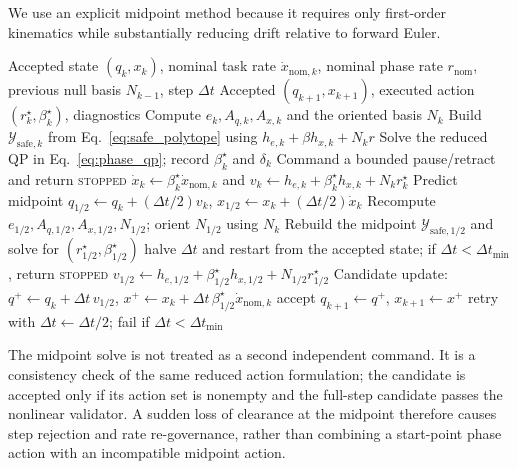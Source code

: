 \documentclass[preprint,12pt]{elsarticle}
\begin{document}
We use an explicit midpoint method because it requires only first-order kinematics while substantially reducing drift relative to forward Euler.

\begin{algorithm}[t]
\caption{One adaptive branch-preserving differential-lift step}
\label{alg:lift_step}
\begin{algorithmic}[1]
\Require Accepted state $(q_k,x_k)$, nominal task rate $\dot x_{\mathrm{nom},k}$, nominal phase rate $r_{\mathrm{nom}}$, previous null basis $N_{k-1}$, step $\Delta t$
\Ensure Accepted $(q_{k+1},x_{k+1})$, executed action $(r_k^\star,\beta_k^\star)$, diagnostics
\State Compute $e_k,A_{q,k},A_{x,k}$ and the oriented basis $N_k$
\State Build $\mathcal Y_{\mathrm{safe},k}$ from Eq.~\eqref{eq:safe_polytope} using $h_{e,k}+\beta h_{x,k}+N_kr$
\State Solve the reduced QP in Eq.~\eqref{eq:phase_qp}; record $\beta_k^\star$ and $\delta_k$
    \State Command a bounded pause/retract and return \textsc{stopped}
\EndIf
\State $\dot x_k\gets\beta_k^\star\dot x_{\mathrm{nom},k}$ and $v_k\gets h_{e,k}+\beta_k^\star h_{x,k}+N_kr_k^\star$
\State Predict midpoint $q_{1/2}\gets q_k+(\Delta t/2)v_k$, $x_{1/2}\gets x_k+(\Delta t/2)\dot x_k$
\State Recompute $e_{1/2},A_{q,1/2},A_{x,1/2},N_{1/2}$; orient $N_{1/2}$ using $N_k$
\State Rebuild the midpoint $\mathcal Y_{\mathrm{safe},1/2}$ and solve for $(r_{1/2}^\star,\beta_{1/2}^\star)$
    \State halve $\Delta t$ and restart from the accepted state; if $\Delta t<\Delta t_{\min}$, return \textsc{stopped}
\EndIf
\State $v_{1/2}\gets h_{e,1/2}+\beta_{1/2}^\star h_{x,1/2}+N_{1/2}r_{1/2}^\star$
\State Candidate update: $q^+\gets q_k+\Delta t\,v_{1/2}$, $x^+\gets x_k+\Delta t\,\beta_{1/2}^\star\dot x_{\mathrm{nom},k}$
    \State accept $q_{k+1}\gets q^+$, $x_{k+1}\gets x^+$
\Else
    \State retry with $\Delta t\gets\Delta t/2$; fail if $\Delta t<\Delta t_{\min}$
\EndIf
\end{algorithmic}
\end{algorithm}

The midpoint solve is not treated as a second independent command. It is a consistency check of the same reduced action formulation; the candidate is accepted only if its action set is nonempty and the full-step candidate passes the nonlinear validator. A sudden loss of clearance at the midpoint therefore causes step rejection and rate re-governance, rather than combining a start-point phase action with an incompatible midpoint action.
\end{document}

